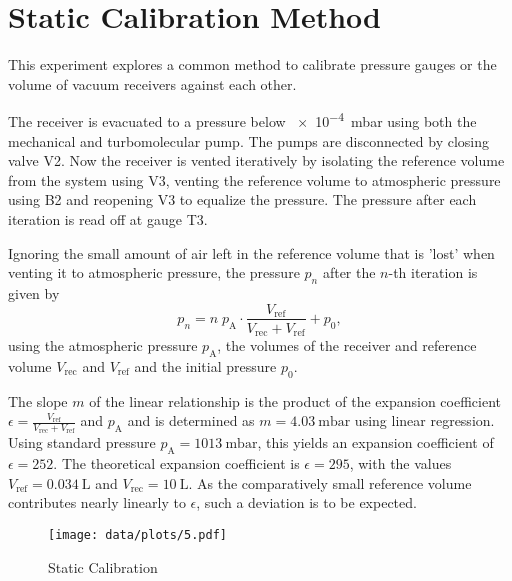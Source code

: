 \chapter{Static Calibration Method}

This experiment explores a common method to calibrate pressure gauges or the volume of vacuum receivers against each other.

The receiver is evacuated to a pressure below \SI{e-4}{\milli\bar} using both the mechanical and turbomolecular pump.
The pumps are disconnected by closing valve V2.
Now the receiver is vented iteratively by isolating the reference volume from the system using V3, venting the reference volume to atmospheric pressure using B2 and reopening V3 to equalize the pressure.
The pressure after each iteration is read off at gauge T3.

Ignoring the small amount of air left in the reference volume that is 'lost' when venting it to atmospheric pressure, the pressure $p_n$ after the $n$-th iteration is given by
\begin{equation}
	p_n = n \; p_\text{A} \cdot \frac{V_\text{ref}}{V_\text{rec} + V_\text{ref}} + p_0,
\end{equation}
using the atmospheric pressure $p_\text{A}$, the volumes of the receiver and reference volume $V_\text{rec}$ and $V_\text{ref}$ and the initial pressure $p_0$.

The slope $m$ of the linear relationship is the product of the expansion coefficient $\epsilon = \frac{V_\text{ref}}{V_\text{rec} + V_\text{ref}}$ and $p_\text{A}$ and is determined as $m = \SI{4.03}{\milli\bar}$ using linear regression.
Using standard pressure $p_\text{A} = \SI{1013}{\milli\bar}$, this yields an expansion coefficient of $\epsilon = \num{252}$.
The theoretical expansion coefficient is $\epsilon = \num{295}$, with the values $V_\text{ref} = \SI{0.034}{\liter}$ and $V_\text{rec} = \SI{10}{\liter}$.
As the comparatively small reference volume contributes nearly linearly to $\epsilon$, such a deviation is to be expected.


\begin{figure}[b!]
	\centering
	\texttt{[image: data/plots/5.pdf]}
	\caption{Static Calibration}
	\label{fig:static-cal}
\end{figure}
